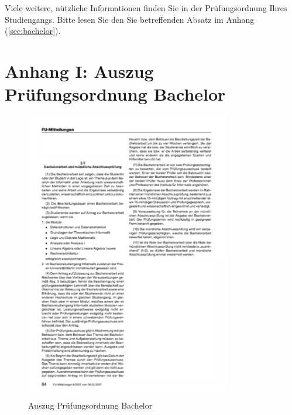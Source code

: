 \documentclass[pdftex,a4paper,12pt]{scrartcl}
\begin{document}
Viele weitere, nützliche Informationen finden Sie in der Prüfungsordnung Ihres Studiengangs. Bitte lesen Sie den Sie betreffenden Absatz im Anhang (\ref{sec:bachelor}). 
\newpage
{}
{}   %

\newpage 
\section*{Anhang I: Auszug Prüfungsordnung Bachelor}
\label{sec:bachelor}     
\begin{figure}[!h]
	\centering
		\includegraphics[width=0.8\textwidth]{pics/Auszug_Bachelor_Pruefungsordnung.pdf}
	\caption{Auszug Prüfungsordnung Bachelor} 
\end{figure}
\end{document}
